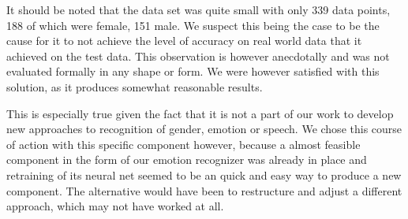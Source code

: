 It should be noted that the data set was quite small with only 339 data points, 188 of which were female, 151 male. 
We suspect this being the case to be the cause for it to not achieve the level of accuracy on real world data that it achieved on the test data.
This observation is however anecdotally and was not evaluated formally in any shape or form.
We were however satisfied with this solution, as it produces somewhat reasonable results.

This is especially true given the fact that it is not a part of our work to develop new approaches to recognition of gender, emotion or speech.
We chose this course of action with this specific component however, because a almost feasible component in the form of our emotion recognizer was already in place and retraining of its neural net seemed to be an quick and easy way to produce a new component.
The alternative would have been to restructure and adjust
a different approach, which may not have worked at all.







